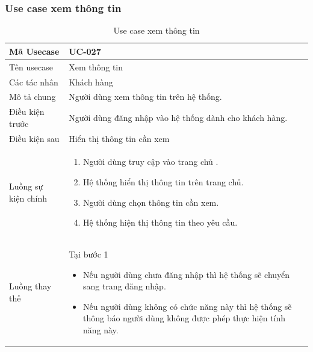 \documentclass[12pt,a4paper]{article}
\begin{document}
    \subsubsection*{Use case xem thông tin}
    \begin{table}[H]
        \centering
        \begin{tabular}{|p{3.5cm}|p{11.5cm}|c|}
            \hline
            Mã Usecase      & UC-027                                                 \\
            \hline
            Tên usecase     & Xem thông tin                                          \\
            \hline
            Các tác nhân    & Khách hàng                                             \\
            \hline
            Mô tả chung     & Người dùng xem thông tin trên hệ thống.                \\
            \hline

            Điều kiện trước & Người dùng đăng nhập vào hệ thống dành cho khách hàng. \\
            \hline

            Điều kiện sau   & Hiển thị thông tin cần xem                             \\
            \hline

            Luồng sự kiện chính & \vspace{-.8cm}\begin{enumerate}
                                                    \item Người dùng truy cập vào trang chủ .
                                                    \item Hệ thống hiển thị thông tin trên trang chủ.
                                                    \item Người dùng chọn thông tin cần xem.
                                                    \item Hệ thống hiện thị thông tin theo yêu cầu.
            \end{enumerate}
            \\
            \hline
            Luồng thay thế & Tại bước 1\newline
            \vspace{-.8cm}\begin{itemize}
                              \item Nếu người dùng chưa đăng nhập thì hệ thống sẽ chuyển sang trang đăng nhập.
                              \item Nếu người dùng không có chức năng này thì hệ thống sẽ thông báo người dùng không được phép thực hiện tính năng này.
            \end{itemize}

            \\ \hline
        \end{tabular}
        \caption{Use case xem thông tin}

    \end{table}
\end{document}
